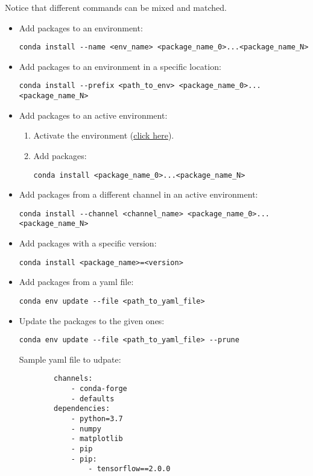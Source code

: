 Notice that different commands can be mixed and matched.
\begin{itemize}
    \item Add packages to an environment:
    \begin{verbatim}
conda install --name <env_name> <package_name_0>...<package_name_N>
    \end{verbatim}
    \item Add packages to an environment in a specific location:
    \begin{verbatim}
conda install --prefix <path_to_env> <package_name_0>...<package_name_N>
    \end{verbatim}
    \item Add packages to an active environment:
    \begin{enumerate}
        \item Activate the environment (\hyperref[conda:activateEnv]{click here}).
        \item Add packages: 
        \begin{verbatim}
conda install <package_name_0>...<package_name_N>
        \end{verbatim}
    \end{enumerate}
    \item Add packages from a different channel in an active environment:
    \begin{verbatim}
conda install --channel <channel_name> <package_name_0>...<package_name_N>
    \end{verbatim}
    \item Add packages with a specific version:
    \begin{verbatim}
conda install <package_name>=<version>
    \end{verbatim}
    \item Add packages from a yaml file:
    \begin{verbatim}
conda env update --file <path_to_yaml_file>
    \end{verbatim}
    \item Update the packages to the given ones:
    \begin{verbatim}
conda env update --file <path_to_yaml_file> --prune
    \end{verbatim}
    Sample yaml file to udpate:
    \begin{verbatim}
        channels:
            - conda-forge
            - defaults
        dependencies:
            - python=3.7
            - numpy
            - matplotlib
            - pip
            - pip:
                - tensorflow==2.0.0
            \end{verbatim}
\end{itemize}


